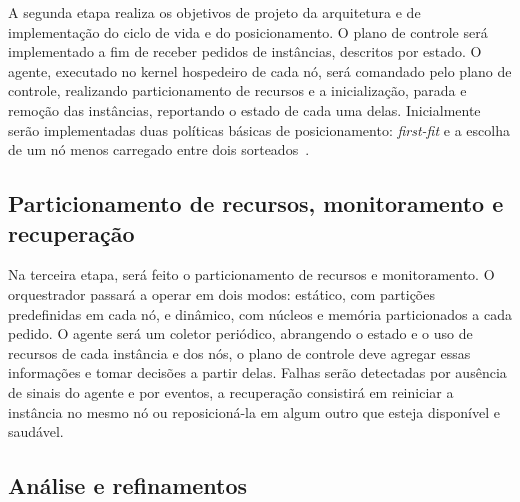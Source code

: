 \documentclass[12pt]{article}
\begin{document}
A segunda etapa realiza os objetivos de projeto da arquitetura e de implementação do ciclo de vida e do posicionamento.
O plano de controle será implementado a fim de receber pedidos de instâncias, descritos por estado.
O agente, executado no kernel hospedeiro de cada nó, será comandado pelo plano de controle, realizando particionamento de recursos e a inicialização, parada e remoção das
instâncias, reportando o estado de cada uma delas.
Inicialmente serão implementadas duas políticas básicas de posicionamento: \textit{first-fit} e a escolha de um nó menos
carregado entre dois sorteados~\cite{mitzenmacher2001power}.

\subsection{Particionamento de recursos, monitoramento e recuperação}\label{subsec:particionamento-de-recursos-monitoramento-e-recuperacao}

Na terceira etapa, será feito o particionamento de recursos e monitoramento.
O orquestrador passará a operar em dois modos: estático, com partições predefinidas em cada nó, e dinâmico, com núcleos e memória particionados
a cada pedido.
O agente será um coletor periódico, abrangendo o estado e o uso de recursos de cada
instância e dos nós, o plano de controle deve agregar essas informações e tomar decisões a partir delas.
Falhas serão detectadas por ausência de sinais do agente e por eventos, a recuperação consistirá em reiniciar a instância
no mesmo nó ou reposicioná-la em algum outro que esteja disponível e saudável.

\subsection{Análise e refinamentos}
\end{document}
